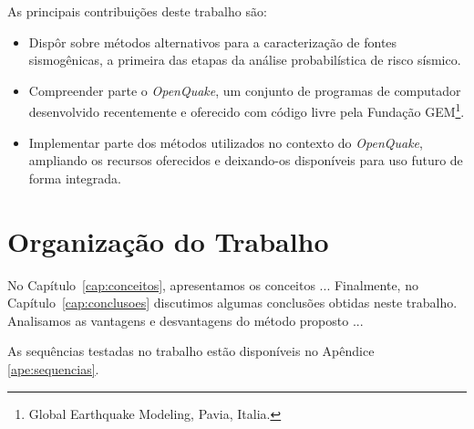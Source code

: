 As principais contribuições deste trabalho são:

\begin{itemize}
  \item Dispôr sobre métodos alternativos para a caracterização de fontes
  sismogênicas, a primeira das etapas da análise probabilística de risco
  sísmico.

  \item Compreender parte o \emph{OpenQuake}, um conjunto de programas de
  computador desenvolvido recentemente e oferecido com código livre pela Fundação
  GEM\footnote{Global Earthquake Modeling, Pavia, Italia.}. 
  
  \item Implementar parte dos métodos utilizados no contexto do
  \emph{OpenQuake}, ampliando os recursos oferecidos e deixando-os disponíveis
  para uso futuro de forma integrada.

\end{itemize}

\section{Organização do Trabalho}
\label{sec:organizacao_trabalho}

No Capítulo~\ref{cap:conceitos}, apresentamos os conceitos ... Finalmente, no
Capítulo~\ref{cap:conclusoes} discutimos algumas conclusões obtidas neste
trabalho. Analisamos as vantagens e desvantagens do método proposto ... 

As sequências testadas no trabalho estão disponíveis no Apêndice \ref{ape:sequencias}.
